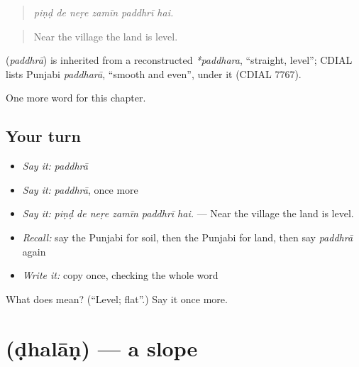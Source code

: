 \begin{quote}
     
\end{quote}

\begin{quote}
\emph{piṇḍ de neṛe zamīn paddhrī hai.}
\end{quote}

\begin{quote}
Near the village the land is level.
\end{quote}

\begin{cousinweb}
\textbf{} (\emph{paddhrā}) is inherited from a reconstructed \emph{*paddhara}, \textquotedblleft{}straight, level\textquotedblright{}; CDIAL lists Punjabi \emph{paddharā}, \textquotedblleft{}smooth and even\textquotedblright{}, under it (CDIAL 7767).
\end{cousinweb}

\begin{grammarlens}[title={What you've built}]
One more word for this chapter.
\end{grammarlens}

\subsection*{Your turn}
\begin{itemize}
\raggedright
  \item \emph{Say it:} \emph{paddhrā}
  \item \emph{Say it:} \emph{paddhrā}, once more
  \item \emph{Say it:} \emph{piṇḍ de neṛe zamīn paddhrī hai.} — Near the village the land is level.
  \item \emph{Recall:} say the Punjabi for soil, then the Punjabi for land, then say \emph{paddhrā} again
  \item \emph{Write it:} copy \textbf{} once, checking the whole word
\end{itemize}

\begin{tcolorbox}[breakable,colback=teal!4,colframe=teal!35!black,title={Before you move on}]
What does  mean? (\textquotedblleft{}Level; flat\textquotedblright{}.) Say it once more.
\end{tcolorbox}
\section[\texorpdfstring{\pa{ਢਲਾਣ} (ḍhalāṇ)}{ਢਲਾਣ (ḍhalāṇ)}]{ (ḍhalāṇ) — a slope}

